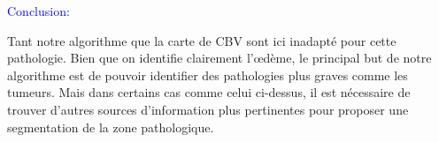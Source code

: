 \bigskip
\begin{Large}
\textcolor{blue}{Conclusion:}
\end{Large}
\medskip


Tant notre algorithme que la carte de CBV sont ici inadapté pour cette pathologie. Bien que on identifie clairement l'œdème, le principal but de notre algorithme est de pouvoir identifier des pathologies plus graves comme les tumeurs. Mais dans certains cas comme celui ci-dessus, il est nécessaire de trouver d'autres sources d'information plus pertinentes pour proposer une segmentation de la zone pathologique.
